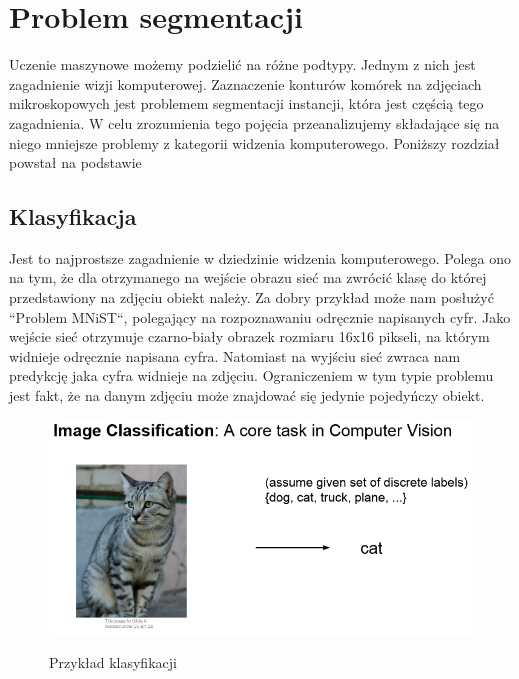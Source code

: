 \documentclass{article}
\begin{document}
\section{Problem segmentacji}
Uczenie maszynowe możemy podzielić na różne podtypy.
Jednym z nich jest zagadnienie wizji komputerowej.
Zaznaczenie konturów komórek na zdjęciach mikroskopowych jest problemem segmentacji instancji, która jest częścią tego zagadnienia.
W celu zrozumienia tego pojęcia przeanalizujemy składające się na niego mniejsze problemy z kategorii widzenia komputerowego.
Poniższy rozdział powstał na podstawie \cite{unet}
\subsection{Klasyfikacja}
Jest to najprostsze zagadnienie w dziedzinie widzenia komputerowego.
Polega ono na tym, że dla otrzymanego na wejście obrazu sieć ma zwrócić klasę do której przedstawiony na zdjęciu obiekt należy.
Za dobry przykład może nam posłużyć ``Problem MNiST``, polegający na rozpoznawaniu odręcznie napisanych cyfr.
Jako wejście sieć otrzymuje czarno-biały obrazek rozmiaru 16x16 pikseli, na którym widnieje odręcznie napisana cyfra.
Natomiast na wyjściu sieć zwraca nam predykcję jaka cyfra widnieje na zdjęciu.
Ograniczeniem w tym typie problemu jest fakt, że na danym zdjęciu może znajdować się jedynie pojedyńczy obiekt.
\begin{figure}[H]
    \centering
    \includegraphics[width=\linewidth]{images/klasyfikacja.png}
    \caption{Przykład klasyfikacji}
    \cite{unet}
    \label{fig:klasyfikacja}
\end{figure}
\end{document}

